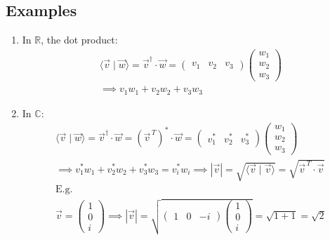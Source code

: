 \documentclass[a4paper, 11pt, normalem]{report}
\newcommand\R{\mathbb{R}}
\begin{document}
\subsection{Examples}
\begin{enumerate}
    \item In $\R$, the dot product:
            \begin{gather*}
                \langle \vec{v} \mid \vec{w} \rangle = \vec{v}^{\dagger} \cdot \vec{w} =
                \begin{pmatrix}
                    v_1 & v_2 & v_3
                \end{pmatrix}
                \begin{pmatrix}
                    w_1 \\
                    w_2 \\
                    w_3
                \end{pmatrix} \\
                \implies v_{1}w_{1} + v_{2}w_{2} + v_{3}w_{3}
            \end{gather*}
    \item In $\mathbb{C}$:
            \begin{gather*}
                \langle \vec{v} \mid \vec{w} \rangle = \vec{v}^{\dagger} \cdot \vec{w} = (\vec{v}^{\,T})^{*} \cdot \vec{w} =
                \begin{pmatrix}
                    v_{1}^{*} & v_{2}^{*} & v_{3}^{*}
                \end{pmatrix}
                \begin{pmatrix}
                    w_1 \\
                    w_2 \\
                    w_3
                \end{pmatrix} \\
                \implies v_{1}^{*}w_{1} + v_{2}^{*}w_2 + v_{3}^{*}w_3 = v_{i}^{*}w_i
                \implies |\vec{v}| = \sqrt{\langle \vec{v} \mid \vec{v} \rangle} = \sqrt{\vec{v}^{\,T} \cdot \vec{v}} \\
                \text{E.g.} \\
                \vec{v} =
                \begin{pmatrix}
                    1 \\
                    0 \\
                    i
                \end{pmatrix} \implies |\vec{v}| =
                \sqrt{  \begin{pmatrix}
                            1 & 0 & -i
                        \end{pmatrix}
                        \begin{pmatrix}
                            1 \\
                            0 \\
                            i
                        \end{pmatrix}} = \sqrt{1 + 1} = \sqrt{2}
            \end{gather*}
\end{enumerate}
\end{document}
